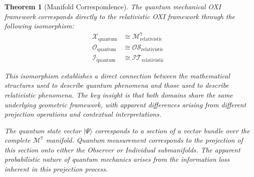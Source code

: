 \documentclass{article}
\newtheorem{theorem}{Theorem}
\begin{document}
\begin{theorem}[Manifold Correspondence]
The quantum mechanical OXI framework corresponds directly to the relativistic OXI framework through the following isomorphism:
\begin{align}
\mathcal{X}_{\text{quantum}} &\cong \mathcal{M}^7_{\text{relativistic}} \\
\mathcal{O}_{\text{quantum}} &\cong \mathcal{OS}_{\text{relativistic}} \\
\mathcal{I}_{\text{quantum}} &\cong \mathcal{IT}_{\text{relativistic}}
\end{align}

This isomorphism establishes a direct connection between the mathematical structures used to describe quantum phenomena and those used to describe relativistic phenomena. The key insight is that both domains share the same underlying geometric framework, with apparent differences arising from different projection operations and contextual interpretations.

The quantum state vector $|\Psi\rangle$ corresponds to a section of a vector bundle over the complete $\mathcal{M}^7$ manifold. Quantum measurement corresponds to the projection of this section onto either the Observer or Individual submanifolds. The apparent probabilistic nature of quantum mechanics arises from the information loss inherent in this projection process.
\end{theorem}
\end{document}
